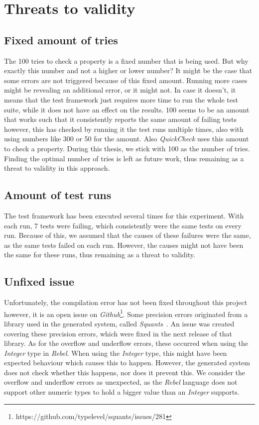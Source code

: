 \section{Threats to validity}

\subsection*{Fixed amount of tries}
The 100 tries to check a property is a fixed number that is being used. But why
exactly this number and not a higher or lower number? It might be the case that
some errors are not triggered because of this fixed amount. Running more cases
might be revealing an additional error, or it might not. In case it doesn't, it
means that the test framework just requires more time to run the whole test suite,
while it does not have an effect on the results. 100 seems to be an amount that
works such that it consistently reports the same amount of failing tests
however, this has checked by running it the test runs multiple times, also with
using numbers like 300 or 50 for the amount. Also \textit{QuickCheck} uses this
amount to check a property. During this thesis, we stick with 100 as the number
of tries. Finding the optimal number of tries is left as future work, thus
remaining as a threat to validity in this approach.

\subsection*{Amount of test runs}
The test framework has been executed several times for this experiment. With
each run, 7 tests were failing, which consistently were the same tests on every
run. Because of this, we assumed that the causes of these failures were the
same, as the same tests failed on each run. However, the causes might not have
been the same for these runs, thus remaining as a threat to validity.

\subsection*{Unfixed issue}
Unfortunately, the compilation error has not been fixed throughout this project
however, it is an open issue on
\textit{Github}\footnote{https://github.com/typelevel/squants/issues/281}. Some
precision errors originated from a library used in the generated system, called
\textit{Squants}~\cite{siteSquants2017}. An issue was created covering these precision
errors, which were fixed in the next release of that library. As for the
overflow and underflow errors, these occurred when using the \textit{Integer}
type in \textit{Rebel}. When using the \textit{Integer} type, this might have
been expected behaviour which causes this to happen. However, the generated
system does not check whether this happens, nor does it prevent this. We
consider the overflow and underflow errors as unexpected, as the \textit{Rebel}
language does not support other numeric types to hold a bigger value than an
\textit{Integer} supports.
